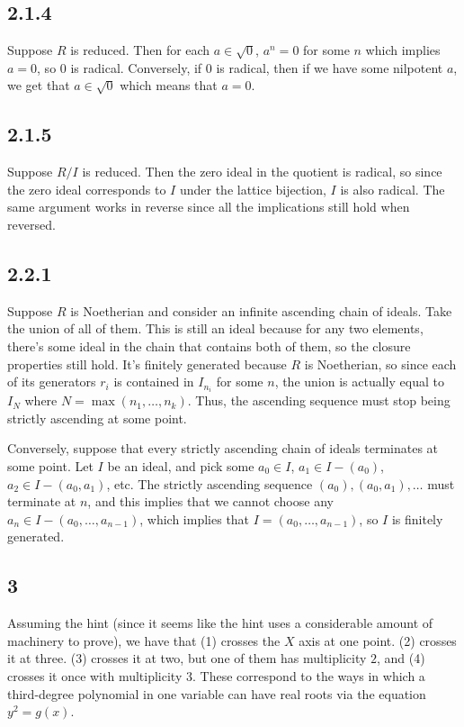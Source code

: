 \documentclass{article}
\begin{document}
\subsection*{2.1.4}
Suppose $R$ is reduced. Then for each $a\in\sqrt{0}$, $a^n=0$ for some $n$ which implies $a=0$, so $0$ is radical. Conversely, if $0$ is radical, then if we have some nilpotent $a$, we get that $a\in\sqrt{0}$ which means that $a=0$.
\subsection*{2.1.5}
Suppose $R/I$ is reduced. Then the zero ideal in the quotient is radical, so since the zero ideal corresponds to $I$ under the lattice bijection, $I$ is also radical. The same argument works in reverse since all the implications still hold when reversed.
\subsection*{2.2.1}
Suppose $R$ is Noetherian and consider an infinite ascending chain of ideals. Take the union of all of them. This is still an ideal because for any two elements, there's some ideal in the chain that contains both of them, so the closure properties still hold. It's finitely generated because $R$ is Noetherian, so since each of its generators $r_i$ is contained in $I_{n_i}$ for some $n$, the union is actually equal to $I_N$ where $N=\max(n_1,\ldots,n_k)$. Thus, the ascending sequence must stop being strictly ascending at some point.

Conversely, suppose that every strictly ascending chain of ideals terminates at some point. Let $I$ be an ideal, and pick some $a_0\in I$, $a_1\in I-(a_0)$, $a_2\in I-(a_0,a_1)$, etc. The strictly ascending sequence $(a_0),(a_0,a_1),\ldots$ must terminate at $n$, and this implies that we cannot choose any $a_n\in I-(a_0,\ldots,a_{n-1})$, which implies that $I=(a_0,\ldots,a_{n-1})$, so $I$ is finitely generated.
\subsection*{3}
Assuming the hint (since it seems like the hint uses a considerable amount of machinery to prove), we have that (1) crosses the $X$ axis at one point. (2) crosses it at three. (3) crosses it at two, but one of them has multiplicity $2$, and (4) crosses it once with multiplicity $3$. These correspond to the ways in which a third-degree polynomial in one variable can have real roots via the equation $y^2=g(x)$.
\end{document}

